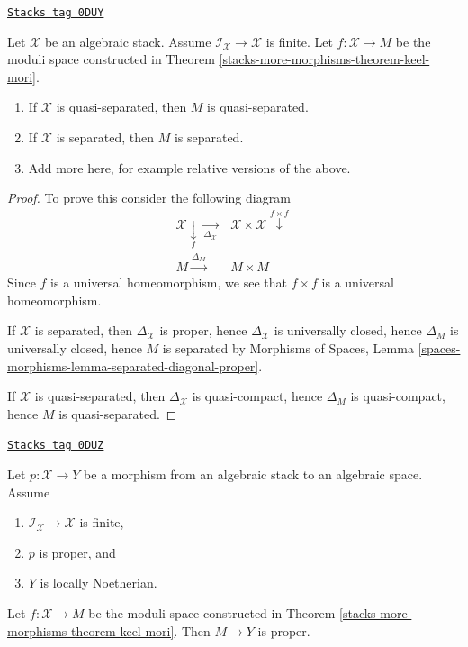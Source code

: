 \begin{lemma}
\label{stacks-more-morphisms-lemma-keel-mori-diagonal}
\href{https://stacks.math.columbia.edu/tag/0DUY}{\texttt{Stacks tag 0DUY}}

Let $\mathcal{X}$ be an algebraic stack. Assume
$\mathcal{I}_\mathcal{X} \to \mathcal{X}$ is finite.
Let $f : \mathcal{X} \to M$ be the moduli space constructed in
Theorem \ref{stacks-more-morphisms-theorem-keel-mori}.
\begin{enumerate}
\item If $\mathcal{X}$ is quasi-separated, then $M$ is quasi-separated.
\item If $\mathcal{X}$ is separated, then $M$ is separated.
\item Add more here, for example relative versions of the above.
\end{enumerate}
\end{lemma}

\begin{proof}
To prove this consider the following diagram
$$
\begin{array}{cc}\mathcal{X} \underset{f}{\downarrow}\underset{\Delta_\mathcal{X}}{\longrightarrow} & \mathcal{X} \times \mathcal{X} \overset{f \times f}{\downarrow} \\ M \overset{\Delta_M}{\longrightarrow} & M \times M\end{array}
$$
Since $f$ is a universal homeomorphism, we see that
$f \times f$ is a universal homeomorphism.

\medskip\noindent
If $\mathcal{X}$ is separated, then $\Delta_\mathcal{X}$ is proper,
hence $\Delta_\mathcal{X}$ is universally closed, hence
$\Delta_M$ is universally closed, hence $M$ is separated
by Morphisms of Spaces, Lemma
\ref{spaces-morphisms-lemma-separated-diagonal-proper}.

\medskip\noindent
If $\mathcal{X}$ is quasi-separated, then $\Delta_\mathcal{X}$ is
quasi-compact, hence $\Delta_M$ is quasi-compact, hence $M$ is
quasi-separated.
\end{proof}

\begin{lemma}
\label{stacks-more-morphisms-lemma-keel-mori-proper}
\href{https://stacks.math.columbia.edu/tag/0DUZ}{\texttt{Stacks tag 0DUZ}}

Let $p : \mathcal{X} \to Y$ be a morphism from an algebraic stack
to an algebraic space. Assume
\begin{enumerate}
\item $\mathcal{I}_\mathcal{X} \to \mathcal{X}$ is finite,
\item $p$ is proper, and
\item $Y$ is locally Noetherian.
\end{enumerate}
Let $f : \mathcal{X} \to M$ be the moduli space constructed in
Theorem \ref{stacks-more-morphisms-theorem-keel-mori}. Then $M \to Y$ is proper.
\end{lemma}

